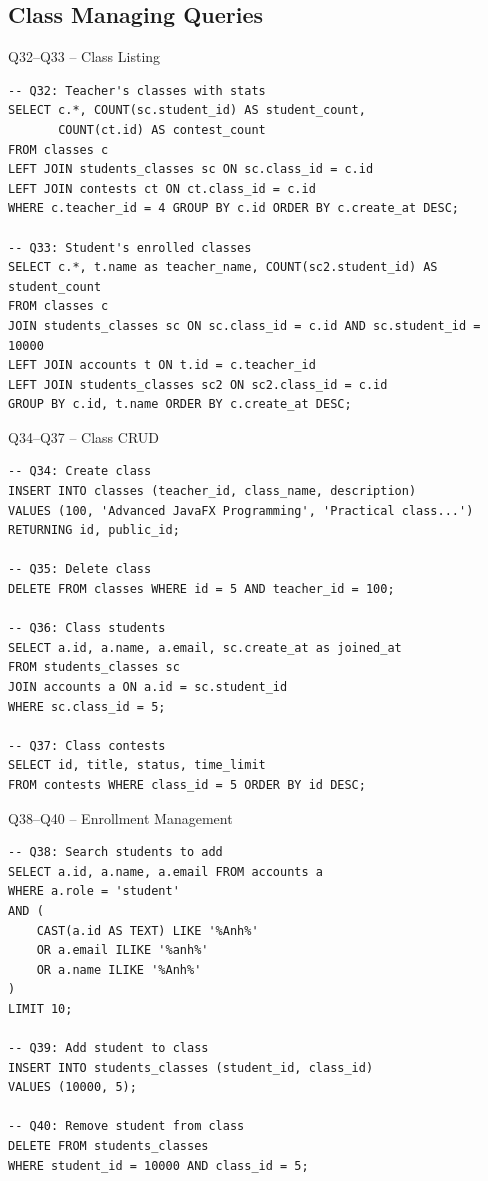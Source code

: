 \documentclass[aspectratio=169, 10pt]{beamer}
\begin{document}
\subsection{Class Managing Queries}

\begin{frame}[fragile]{Q32--Q33 -- Class Listing}
    \begin{lstlisting}
-- Q32: Teacher's classes with stats
SELECT c.*, COUNT(sc.student_id) AS student_count, 
       COUNT(ct.id) AS contest_count
FROM classes c
LEFT JOIN students_classes sc ON sc.class_id = c.id
LEFT JOIN contests ct ON ct.class_id = c.id
WHERE c.teacher_id = 4 GROUP BY c.id ORDER BY c.create_at DESC;

-- Q33: Student's enrolled classes
SELECT c.*, t.name as teacher_name, COUNT(sc2.student_id) AS student_count
FROM classes c
JOIN students_classes sc ON sc.class_id = c.id AND sc.student_id = 10000
LEFT JOIN accounts t ON t.id = c.teacher_id
LEFT JOIN students_classes sc2 ON sc2.class_id = c.id
GROUP BY c.id, t.name ORDER BY c.create_at DESC;
    \end{lstlisting}
\end{frame}


\begin{frame}[fragile]{Q34--Q37 -- Class CRUD}
    \begin{lstlisting}
-- Q34: Create class
INSERT INTO classes (teacher_id, class_name, description) 
VALUES (100, 'Advanced JavaFX Programming', 'Practical class...') 
RETURNING id, public_id;

-- Q35: Delete class
DELETE FROM classes WHERE id = 5 AND teacher_id = 100;

-- Q36: Class students
SELECT a.id, a.name, a.email, sc.create_at as joined_at 
FROM students_classes sc
JOIN accounts a ON a.id = sc.student_id 
WHERE sc.class_id = 5;

-- Q37: Class contests
SELECT id, title, status, time_limit 
FROM contests WHERE class_id = 5 ORDER BY id DESC;
    \end{lstlisting}
\end{frame}


\begin{frame}[fragile]{Q38--Q40 -- Enrollment Management}
    \begin{lstlisting}
-- Q38: Search students to add
SELECT a.id, a.name, a.email FROM accounts a
WHERE a.role = 'student' 
AND (
    CAST(a.id AS TEXT) LIKE '%Anh%' 
    OR a.email ILIKE '%anh%' 
    OR a.name ILIKE '%Anh%'
) 
LIMIT 10;

-- Q39: Add student to class
INSERT INTO students_classes (student_id, class_id) 
VALUES (10000, 5);

-- Q40: Remove student from class
DELETE FROM students_classes 
WHERE student_id = 10000 AND class_id = 5;
    \end{lstlisting}
\end{frame}
\end{document}
